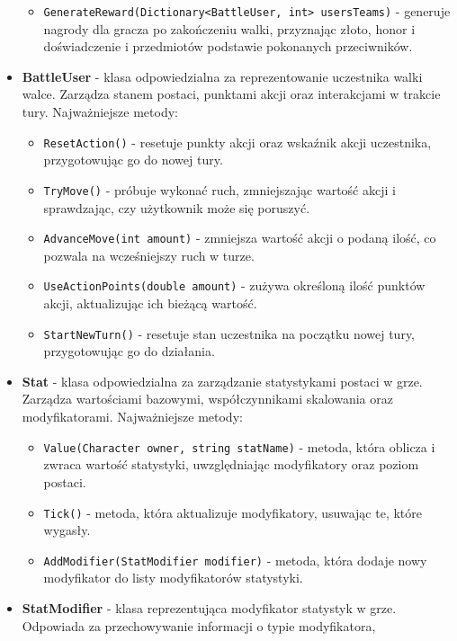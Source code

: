 \begin{itemize}
\begin{itemize}
                \item \texttt{GenerateReward(Dictionary<BattleUser, int> usersTeams)} - generuje nagrody dla gracza po zakończeniu walki, przyznając złoto, 
                honor i doświadczenie i przedmiotów podstawie pokonanych przeciwników.
            \end{itemize}
        \item \textbf{BattleUser} - klasa odpowiedzialna za reprezentowanie uczestnika walki walce. 
        Zarządza stanem postaci, punktami akcji oraz interakcjami w trakcie tury. Najważniejsze metody:
            \begin{itemize}
                \item \texttt{ResetAction()} - resetuje punkty akcji oraz wskaźnik akcji uczestnika, przygotowując go do nowej tury.
                \item \texttt{TryMove()} - próbuje wykonać ruch, zmniejszając wartość akcji i sprawdzając, czy użytkownik może się poruszyć.
                \item \texttt{AdvanceMove(int amount)} - zmniejsza wartość akcji o podaną ilość, co pozwala na wcześniejszy ruch w turze.
                \item \texttt{UseActionPoints(double amount)} - zużywa określoną ilość punktów akcji, aktualizując ich bieżącą wartość.
                \item \texttt{StartNewTurn()} - resetuje stan uczestnika na początku nowej tury, przygotowując go do działania.
            \end{itemize}
        \item \textbf{Stat} - klasa odpowiedzialna za zarządzanie statystykami postaci w grze. 
        Zarządza wartościami bazowymi, współczynnikami skalowania oraz modyfikatorami. Najważniejsze metody:
            \begin{itemize}
                \item \texttt{Value(Character owner, string statName)} - metoda, która oblicza i zwraca wartość statystyki, 
                uwzględniając modyfikatory oraz poziom postaci.
                \item \texttt{Tick()} - metoda, która aktualizuje modyfikatory, usuwając te, które wygasły.
                \item \texttt{AddModifier(StatModifier modifier)} - metoda, która dodaje nowy modyfikator do listy modyfikatorów statystyki.
            \end{itemize}
        \item \textbf{StatModifier} - klasa reprezentująca modyfikator statystyk w grze. Odpowiada za przechowywanie informacji o typie modyfikatora,

\end{itemize}
